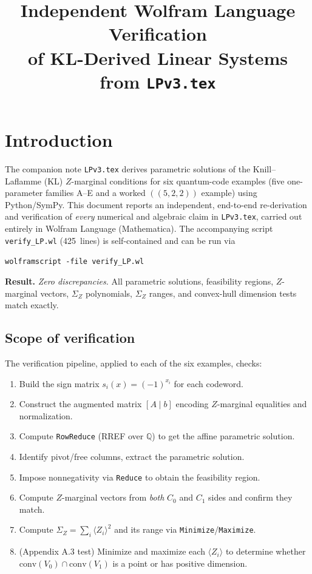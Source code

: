 \documentclass{article}
\title{Independent Wolfram Language Verification \\
  of KL-Derived Linear Systems from \texttt{LPv3.tex}}
\author{}
\date{}
\newcommand{\SigZ}{\Sigma_Z}
\newcommand{\conv}{\mathrm{conv}}
\begin{document}
\maketitle
\tableofcontents

\section{Introduction}

The companion note \texttt{LPv3.tex} derives parametric solutions of the Knill--Laflamme (KL) $Z$-marginal conditions for six quantum-code examples (five one-parameter families A--E and a worked $((5,2,2))$ example) using Python/SymPy.
This document reports an independent, end-to-end re-derivation and verification of \emph{every} numerical and algebraic claim in \texttt{LPv3.tex}, carried out entirely in Wolfram Language (Mathematica).
The accompanying script \texttt{verify\_LP.wl} (425~lines) is self-contained and can be run via
\begin{center}
\texttt{wolframscript -file verify\_LP.wl}
\end{center}

\medskip\noindent
\textbf{Result.} \emph{Zero discrepancies.}
All parametric solutions, feasibility regions, $Z$-marginal vectors, $\SigZ$ polynomials, $\SigZ$ ranges, and convex-hull dimension tests match exactly.

\subsection{Scope of verification}

The verification pipeline, applied to each of the six examples, checks:
\begin{enumerate}
  \item Build the sign matrix $s_i(x)=(-1)^{x_i}$ for each codeword.
  \item Construct the augmented matrix $[A\mid b]$ encoding $Z$-marginal equalities and normalization.
  \item Compute \texttt{RowReduce} (RREF over $\mathbb{Q}$) to get the affine parametric solution.
  \item Identify pivot/free columns, extract the parametric solution.
  \item Impose nonnegativity via \texttt{Reduce} to obtain the feasibility region.
  \item Compute $Z$-marginal vectors from \emph{both} $C_0$ and $C_1$ sides and confirm they match.
  \item Compute $\SigZ=\sum_i \langle Z_i\rangle^2$ and its range via \texttt{Minimize}/\texttt{Maximize}.
  \item (Appendix A.3 test) Minimize and maximize each $\langle Z_i\rangle$ to determine whether $\conv(V_0)\cap\conv(V_1)$ is a point or has positive dimension.
\end{enumerate}
\end{document}
